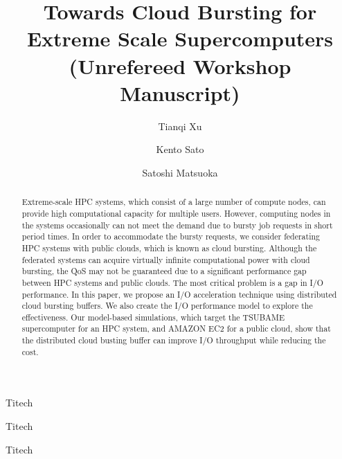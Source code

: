 \documentclass[JIP]{ipsj}
\begin{document}
\title{Towards Cloud Bursting for Extreme Scale Supercomputers\\
   (Unrefereed Workshop Manuscript)}

\author{Tianqi Xu}{Titech}
\author{Kento Sato}{Titech}
\author{Satoshi Matsuoka}{Titech}

\begin{abstract}


Extreme-scale HPC systems, which consist of a large number of compute nodes, can provide high computational capacity for multiple users. However, computing nodes in the systems occasionally can not meet the demand due to bursty job requests in short period times. In order to accommodate the bursty requests, we consider federating HPC systems with public clouds, which is known as cloud bursting. Although the federated systems can acquire virtually infinite computational power with cloud bursting, the QoS may not be guaranteed due to a significant performance gap between HPC systems and public clouds. The most critical problem is a gap in I/O performance. In this paper, we propose an I/O acceleration technique using distributed cloud bursting buffers. We also create the I/O performance model to explore the effectiveness. Our model-based simulations, which target the TSUBAME supercomputer for an HPC system, and AMAZON EC2 for a public cloud, show that the distributed cloud busting buffer can improve I/O throughput while reducing the cost.

\end{abstract}
\end{document}
